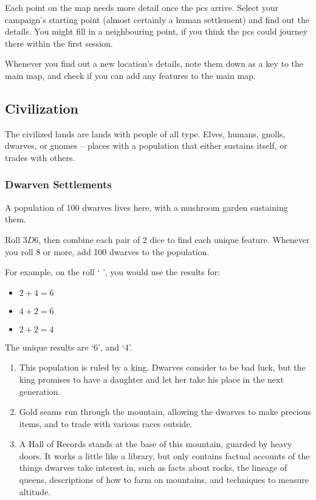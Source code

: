 \begin{multicols}{2}

\noindent
Each point on the map needs more detail once the \glspl{pc} arrive.
Select your campaign's starting point (almost certainly a human settlement) and find out the details.
You might fill in a neighbouring point, if you think the \glspl{pc} could journey there within the first session.

Whenever you find out a new location's details, note them down as a key to the main map, and check if you can add any features to the main map.

\subsection{Civilization}

The civilized lands are lands with people of all type.
Elves, humans, gnolls, dwarves, or gnomes -- places with a population that either sustains itself, or trades with others.

\subsubsection{Dwarven Settlements}
\label{dwarvesPoint}

A population of 100 dwarves lives here, with a mushroom garden sustaining them.

Roll $3D6$, then combine each pair of 2 dice to find each unique feature.
Whenever you roll 8 or more, add 100 dwarves to the population.

\begin{exampletext}
  For example, on the roll `  ', you would use the results for:

  \begin{itemize}
    \item
    $2+4 = 6$
    \item
    $4+2 = 6$
    \item
    $2+2 = 4$
  \end{itemize}

  The unique results are `6', and `4'.
\end{exampletext}

\begin{enumerate}
  \item
  This population is ruled by a king.
  Dwarves consider to be bad luck, but the king promises to have a daughter and let her take his place in the next generation.
  \item
  Gold seams run through the mountain, allowing the dwarves to make precious items, and to trade with various races outside.
  \item
  A Hall of Records stands at the base of this mountain, guarded by heavy doors.
  It works a little like a library, but only contains factual accounts of the things dwarves take interest in, such as facts about rocks, the lineage of queens, descriptions of how to farm on mountains, and techniques to measure altitude.


\end{enumerate}
\end{multicols}
